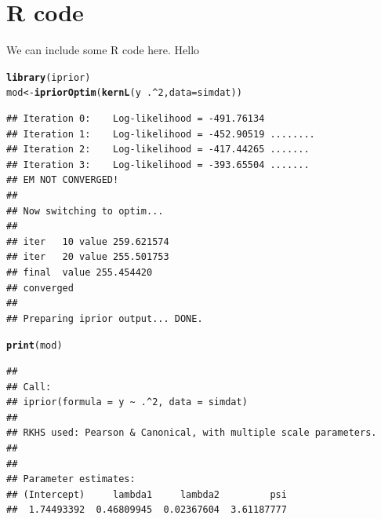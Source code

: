 \documentclass[english, 11pt]{article}\usepackage[]{graphicx}\usepackage[]{color}
\makeatletter
\newcommand{\hlnum}[1]{\textcolor[rgb]{0.686,0.059,0.569}{#1}}%
\newcommand{\hlopt}[1]{\textcolor[rgb]{0,0,0}{#1}}%
\newcommand{\hlstd}[1]{\textcolor[rgb]{0.345,0.345,0.345}{#1}}%
\newcommand{\hlkwb}[1]{\textcolor[rgb]{0.69,0.353,0.396}{#1}}%
\newcommand{\hlkwc}[1]{\textcolor[rgb]{0.333,0.667,0.333}{#1}}%
\newcommand{\hlkwd}[1]{\textcolor[rgb]{0.737,0.353,0.396}{\textbf{#1}}}%
\newenvironment{kframe}{%
 \def\at@end@of@kframe{}%
 \ifinner\ifhmode%
  \def\at@end@of@kframe{\end{minipage}}%
  \begin{minipage}{\columnwidth}%
 \fi\fi%
 \def\FrameCommand##1{\hskip\@totalleftmargin \hskip-\fboxsep
 \colorbox{shadecolor}{##1}\hskip-\fboxsep
     \hskip-\linewidth \hskip-\@totalleftmargin \hskip\columnwidth}%
 \MakeFramed {\advance\hsize-\width
   \@totalleftmargin\z@ \linewidth\hsize
   \@setminipage}}%
 {\par\unskip\endMakeFramed%
 \at@end@of@kframe}
\newenvironment{knitrout}{}{} %
\providecommand{\DIFaddend}{} %
\makeatother
\begin{document}
\DIFaddend \section{R code}



We can include some R code here. Hello

\begin{knitrout}
\color{fgcolor}\begin{kframe}
\begin{alltt}
\hlkwd{library}\hlstd{(iprior)}
\hlstd{mod} \hlkwb{<-} \hlkwd{ipriorOptim}\hlstd{(}\hlkwd{kernL}\hlstd{(y} \hlopt{~} \hlstd{.} \hlopt{^} \hlnum{2}\hlstd{,} \hlkwc{data} \hlstd{= simdat))}
\end{alltt}
\begin{verbatim}
## Iteration 0:    Log-likelihood = -491.76134 
## Iteration 1:    Log-likelihood = -452.90519 ........
## Iteration 2:    Log-likelihood = -417.44265 .......
## Iteration 3:    Log-likelihood = -393.65504 .......
## EM NOT CONVERGED!
## 
## Now switching to optim...
## 
## iter   10 value 259.621574
## iter   20 value 255.501753
## final  value 255.454420 
## converged
## 
## Preparing iprior output... DONE.
\end{verbatim}
\begin{alltt}
\hlkwd{print}\hlstd{(mod)}
\end{alltt}
\begin{verbatim}
## 
## Call:
## iprior(formula = y ~ .^2, data = simdat)
## 
## RKHS used: Pearson & Canonical, with multiple scale parameters.
## 
## 
## Parameter estimates:
## (Intercept)     lambda1     lambda2         psi 
##  1.74493392  0.46809945  0.02367604  3.61187777
\end{verbatim}
\end{kframe}
\end{knitrout}
\end{document}
